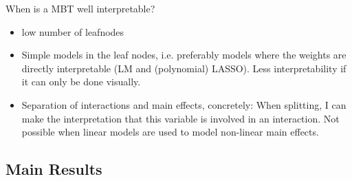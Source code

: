 When is a MBT well interpretable?
\begin{itemize}
    \item low number of leafnodes
    \item Simple models in the leaf nodes, i.e. preferably models where the weights are directly interpretable (LM and (polynomial) LASSO). Less interpretability if it can only be done visually.
    \item Separation of interactions and main effects, concretely: When splitting, I can make the interpretation that this variable is involved in an interaction. Not possible when linear models are used to model non-linear main effects.
\end{itemize}




\subsection{Main Results}
